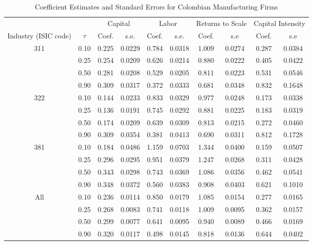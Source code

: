 \begin{table}[ht]
\centering
\caption{Coefficient Estimates and Standard Errors for Colombian Manufacturing Firms} 
\begin{tabular}{cccccccccc}
  \hline\hline & & \multicolumn{2}{c}{Capital}  & \multicolumn{2}{c}{Labor} & \multicolumn{2}{c}{Returns to Scale} & \multicolumn{2}{c}{Capital Intensity}\\ \cmidrule(lr){3-4} \cmidrule(lr){5-6} \cmidrule(lr){7-8} \cmidrule(lr){9-10}Industry (ISIC code) & $\tau$ & Coef. & s.e. & Coef. & s.e. & Coef. & s.e & Coef. & s.e \\ 
  \hline
311 & 0.10 & 0.225 & 0.0229 & 0.784 & 0.0318 & 1.009 & 0.0274 & 0.287 & 0.0384 \\ 
   & 0.25 & 0.254 & 0.0209 & 0.626 & 0.0214 & 0.880 & 0.0222 & 0.405 & 0.0422 \\ 
   & 0.50 & 0.281 & 0.0208 & 0.529 & 0.0205 & 0.811 & 0.0223 & 0.531 & 0.0546 \\ 
   & 0.90 & 0.309 & 0.0317 & 0.372 & 0.0333 & 0.681 & 0.0348 & 0.832 & 0.1648 \\ 
  322 & 0.10 & 0.144 & 0.0233 & 0.833 & 0.0329 & 0.977 & 0.0248 & 0.173 & 0.0338 \\ 
   & 0.25 & 0.136 & 0.0191 & 0.745 & 0.0292 & 0.881 & 0.0225 & 0.183 & 0.0319 \\ 
   & 0.50 & 0.174 & 0.0209 & 0.639 & 0.0309 & 0.813 & 0.0215 & 0.272 & 0.0460 \\ 
   & 0.90 & 0.309 & 0.0354 & 0.381 & 0.0413 & 0.690 & 0.0311 & 0.812 & 0.1728 \\ 
  381 & 0.10 & 0.184 & 0.0486 & 1.159 & 0.0703 & 1.344 & 0.0400 & 0.159 & 0.0507 \\ 
   & 0.25 & 0.296 & 0.0295 & 0.951 & 0.0379 & 1.247 & 0.0268 & 0.311 & 0.0428 \\ 
   & 0.50 & 0.343 & 0.0298 & 0.743 & 0.0369 & 1.086 & 0.0356 & 0.462 & 0.0541 \\ 
   & 0.90 & 0.348 & 0.0372 & 0.560 & 0.0383 & 0.908 & 0.0403 & 0.621 & 0.1010 \\ 
  All & 0.10 & 0.236 & 0.0114 & 0.850 & 0.0179 & 1.085 & 0.0154 & 0.277 & 0.0165 \\ 
   & 0.25 & 0.268 & 0.0083 & 0.741 & 0.0118 & 1.009 & 0.0095 & 0.362 & 0.0157 \\ 
   & 0.50 & 0.299 & 0.0077 & 0.641 & 0.0095 & 0.940 & 0.0089 & 0.466 & 0.0169 \\ 
   & 0.90 & 0.320 & 0.0117 & 0.498 & 0.0145 & 0.818 & 0.0136 & 0.644 & 0.0402 \\ 
   \hline
\end{tabular}
\end{table}
